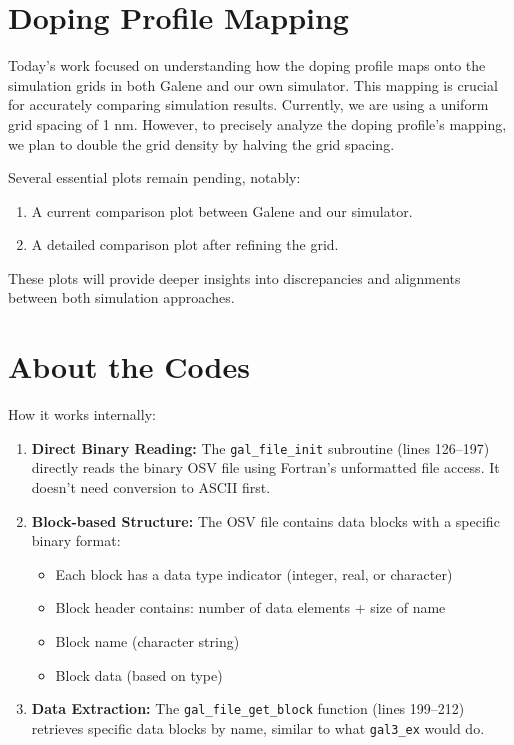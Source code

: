 \section{Doping Profile Mapping}

Today's work focused on understanding how the doping profile maps onto the simulation grids in both Galene and our own simulator. This mapping is crucial for accurately comparing simulation results. Currently, we are using a uniform grid spacing of 1 nm. However, to precisely analyze the doping profile's mapping, we plan to double the grid density by halving the grid spacing.

Several essential plots remain pending, notably:

\begin{enumerate}
\item A current comparison plot between Galene and our simulator.
\item A detailed comparison plot after refining the grid.
\end{enumerate}

These plots will provide deeper insights into discrepancies and alignments between both simulation approaches.

\section{About the Codes}

How it works internally:

\begin{enumerate}
  \item \textbf{Direct Binary Reading:} The \texttt{gal\_file\_init} subroutine (lines 126--197) directly reads the binary OSV file using Fortran's unformatted file access. It doesn't need conversion to ASCII first.
  \item \textbf{Block-based Structure:} The OSV file contains data blocks with a specific binary format:
    \begin{itemize}
      \item Each block has a data type indicator (integer, real, or character)
      \item Block header contains: number of data elements + size of name
      \item Block name (character string)
      \item Block data (based on type)
    \end{itemize}
  \item \textbf{Data Extraction:} The \texttt{gal\_file\_get\_block} function (lines 199--212) retrieves specific data blocks by name, similar to what \texttt{gal3\_ex} would do.
\end{enumerate}

